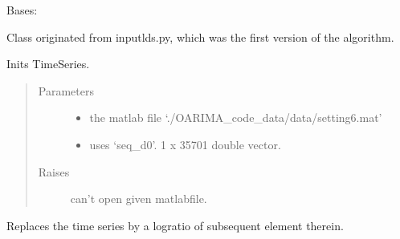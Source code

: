 \documentclass[letterpaper,10pt,english]{sphinxmanual}
\begin{document}
\begin{fulllineitems}
\label{\detokenize{LDS.LDS.ts:LDS.LDS.ts.time_series.TimeSeries}}
\sphinxAtStartPar
Bases: 

\sphinxAtStartPar
Class originated from inputlds.py, which
was the first version of the algorithm.

\sphinxAtStartPar
Inits TimeSeries.
\begin{quote}\begin{description}
\item[{Parameters}] \leavevmode\begin{itemize}
\item {} 
\sphinxAtStartPar
{} \textendash{} the matlab file ‘./OARIMA\_code\_data/data/setting6.mat’

\item {} 
\sphinxAtStartPar
{} \textendash{} uses ‘seq\_d0’. 1 x 35701 double vector.

\end{itemize}

\item[{Raises}] \leavevmode
\sphinxAtStartPar
{} \textendash{} can’t open given matlabfile.

\end{description}\end{quote}

\begin{fulllineitems}
\label{\detokenize{LDS.LDS.ts:LDS.LDS.ts.time_series.TimeSeries.logratio}}
\sphinxAtStartPar
Replaces the time series by a log\sphinxhyphen{}ratio of subsequent element therein.

\end{fulllineitems}



\end{fulllineitems}
\end{document}
